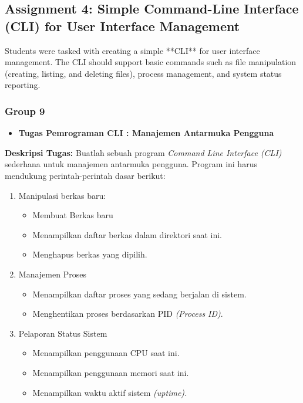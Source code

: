 \documentclass[12pt]{article}
\begin{document}
\subsection{Assignment 4: Simple Command-Line Interface (CLI) for User Interface Management}
Students were tasked with creating a simple **CLI** for user interface management. The CLI should support basic commands such as file manipulation (creating, listing, and deleting files), process management, and system status reporting.

\subsubsection{Group 9}
\begin{itemize}
    \item \textbf{Tugas Pemrograman CLI : Manajemen Antarmuka Pengguna}
\end{itemize}
\par \textbf{Deskripsi Tugas:} Buatlah sebuah program \textit{Command Line Interface (CLI)} sederhana untuk manajemen antarmuka pengguna. Program ini harus mendukung perintah-perintah dasar berikut:
\begin{enumerate}
    \item Manipulasi berkas baru:
    \begin{itemize}
        \item Membuat Berkas baru
        \item Menampilkan daftar berkas dalam direktori saat ini.
        \item Menghapus berkas yang dipilih.
    \end{itemize}
    \item Manajemen Proses
    \begin{itemize}
        \item Menampilkan daftar proses yang sedang berjalan di sistem.
        \item Menghentikan proses berdasarkan PID \textit{(Process ID)}.
    \end{itemize}
    \item Pelaporan Status Sistem
    \begin{itemize}
        \item Menampilkan penggunaan CPU saat ini.
        \item Menampilkan penggunaan memori saat ini.
        \item Menampilkan waktu aktif sistem \textit{(uptime).}
    \end{itemize}
\end{enumerate}
\end{document}
